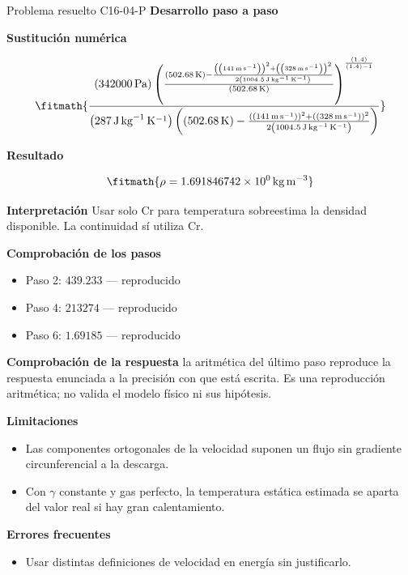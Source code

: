 \documentclass[10pt,openany]{book}
\begin{document}
\begin{studiumworked}{Problema resuelto C16-04-P}
\noindent\textbf{Desarrollo paso a paso}



\noindent\textbf{Sustitución numérica}

\[
\fitmath{\frac{\left(342000\,\mathrm{Pa}\right) \left(\frac{\left(502.68\,\mathrm{K}\right) - \frac{\left(\left(141\,\mathrm{m}\,\mathrm{s}^{-1}\right)\right)^{2} + \left(\left(328\,\mathrm{m}\,\mathrm{s}^{-1}\right)\right)^{2}}{2 \left(1004.5\,\mathrm{J}\,\mathrm{kg}^{-1}\,\mathrm{K}^{-1}\right)}}{\left(502.68\,\mathrm{K}\right)}\right)^{\frac{\left(1.4\right)}{\left(1.4\right) - 1}}}{\left(287\,\mathrm{J}\,\mathrm{kg}^{-1}\,\mathrm{K}^{-1}\right) \left(\left(502.68\,\mathrm{K}\right) - \frac{\left(\left(141\,\mathrm{m}\,\mathrm{s}^{-1}\right)\right)^{2} + \left(\left(328\,\mathrm{m}\,\mathrm{s}^{-1}\right)\right)^{2}}{2 \left(1004.5\,\mathrm{J}\,\mathrm{kg}^{-1}\,\mathrm{K}^{-1}\right)}\right)}}
\]

\noindent\textbf{Resultado}

\[
\fitmath{\rho=1.691846742\times10^{0}\,\mathrm{kg}\,\mathrm{m}^{-3}}
\]

\noindent\textbf{Interpretación}
Usar solo Cr para temperatura sobreestima la densidad disponible. La continuidad sí utiliza Cr.

\noindent\textbf{Comprobación de los pasos}
\begin{itemize}
\item Paso 2: $439.233$ — reproducido
\item Paso 4: $213274$ — reproducido
\item Paso 6: $1.69185$ — reproducido
\end{itemize}

\noindent\textbf{Comprobación de la respuesta} la aritmética del último paso reproduce la respuesta enunciada a la precisión con que está escrita. Es una reproducción aritmética; no valida el modelo físico ni sus hipótesis.

\noindent\textbf{Limitaciones}
\begin{itemize}
\item Las componentes ortogonales de la velocidad suponen un flujo sin gradiente circunferencial a la descarga.
\item Con $\gamma$ constante y gas perfecto, la temperatura estática estimada se aparta del valor real si hay gran calentamiento.
\end{itemize}

\noindent\textbf{Errores frecuentes}
\begin{itemize}
\item Usar distintas definiciones de velocidad en energía sin justificarlo.
\end{itemize}
\end{studiumworked}
\end{document}
